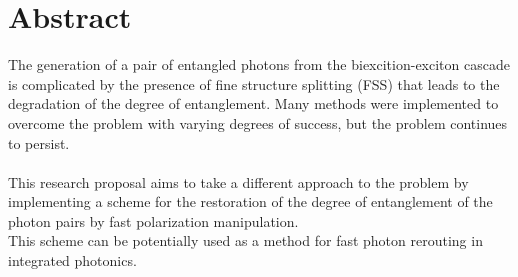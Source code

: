 \chapter*{Abstract}
The generation of a pair of entangled photons from the biexcition-exciton cascade is complicated by the presence of fine structure splitting (FSS) that leads to the degradation of the degree of entanglement. Many methods were implemented to overcome the problem with varying degrees of success, but the problem continues to persist.  \\ \\
This research proposal aims to take a different approach to the problem by implementing a scheme for the restoration of the degree of entanglement of the photon pairs by fast polarization manipulation.\\
This scheme can be potentially used as a method for fast photon rerouting in integrated photonics.   

\cite{Varo2022}



